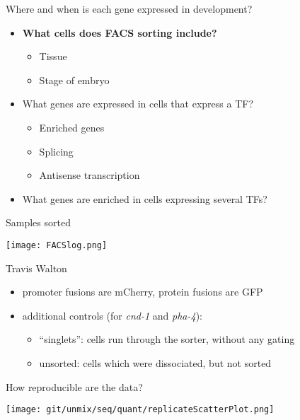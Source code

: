 \documentclass[serif,9pt]{beamer}
\begin{document}
\begin{frame}{Where and when is each gene expressed in development?}
\begin{itemize}
\item {\bf What cells does FACS sorting include?}
\begin{itemize}
\item Tissue
\item Stage of embryo
\end{itemize}
\item What genes are expressed in cells that express a TF?
\begin{itemize}
\item Enriched genes
\item Splicing
\item Antisense transcription
\end{itemize}
\item What genes are enriched in cells expressing several TFs?
\end{itemize}
\end{frame}

\begin{frame}{Samples sorted}

\texttt{[image: FACSlog.png]}

\hfill Travis Walton

\begin{itemize}

\item promoter fusions are mCherry, protein fusions are GFP

\item additional controls (for {\em cnd-1} and {\em pha-4}):

\begin{itemize}

\item ``singlets'': cells run through the sorter, without any gating

\item unsorted: cells which were dissociated, but not sorted

\end{itemize}

\end{itemize}

\end{frame}

\begin{frame}{How reproducible are the data?}

\texttt{[image: git/unmix/seq/quant/replicateScatterPlot.png]}

\end{frame}
\end{document}
